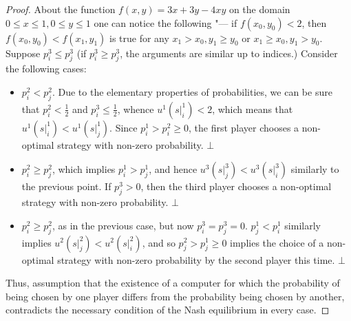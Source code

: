 \begin{proof}
	About the function $f(x,y) = 3x + 3y - 4xy$ on the domain $0 \le x \le 1, 0 \le y \le 1$ one can notice the following "--- if $f(x_0, y_0) < 2$, then $f(x_0, y_0) < f(x_1, y_1)$ is true for any $x_1 > x_0, y_1 \ge y_0$ or $x_1 \ge x_0, y_1 > y_0$. Suppose $p_i ^3 \le p_j^3$ (if $p_i^3 \ge p_j^3$, the arguments are similar up to indices.) Consider the following cases: %
	\begin{itemize}
		\item $p_i^2 < p_j^2$. Due to the elementary properties of probabilities, we can be sure that $p_i^2 < \frac{1}{2}$ and $p_i^3 \le \frac{1}{2}$, whence $u^1(\left .s \right|^1_i) < 2$, which means that $u^1(\left. s \right|^1_i) < u^1(\left. s \right|^1_j)$. Since $p_i^1 > p_i^2 \ge 0$, the first player chooses a non-optimal strategy with non-zero probability. $\bot$ %
		\item $p_i^2 \ge p_j^2$, which implies $p_i^1 > p_j^1$, and hence $u^3(\left. s \right|^3_j) < u^3(\left. s \right|^3_i)$ similarly to the previous point. If $p_j^3 > 0$, then the third player chooses a non-optimal strategy with non-zero probability. $\bot$ %
		\item $p_i^2 \ge p_j^2$, as in the previous case, but now $p_i^3 = p_j^3 = 0$. $p_j^1 < p_i^1$ similarly implies $u^2(\left. s \right|^2_j) < u^2(\left. s \right|^2_i)$, and so $p_j^ 2 > p_j^1 \ge 0$ implies the choice of a non-optimal strategy with non-zero probability by the second player this time. $\bot$ %
	\end{itemize}
	
	Thus, assumption that the existence of a computer for which the probability of being chosen by one player differs from the probability being chosen by another, contradicts the necessary condition of the Nash equilibrium in every case. %
\end{proof}

